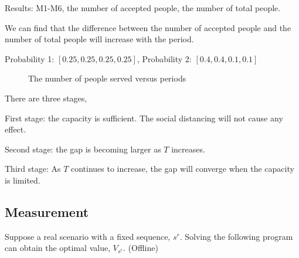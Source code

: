 Results: M1-M6, the number of accepted people, the number of total people.

We can find that the difference between the number of accepted people and the number of total people will increase with the period. 

Probability 1: $[0.25, 0.25, 0.25, 0.25]$,
Probability 2: $[0.4, 0.4, 0.1, 0.1]$

\begin{figure}[h]
  \centering
  \caption{The number of people served versus periods}
  \label{Fig.lable}
\end{figure}

There are three stages, 

First stage: the capacity is sufficient. The social distancing will not cause any effect.

Second stage: the gap is becoming larger as $T$ increases. 

Third stage: As $T$ continues to increase, the gap will converge when the capacity is limited.


\subsection{Measurement}

Suppose a real scenario with a fixed sequence, $s^{r}$. Solving the following program can obtain the optimal value, $V_{s^{r}}$. (Offline)

